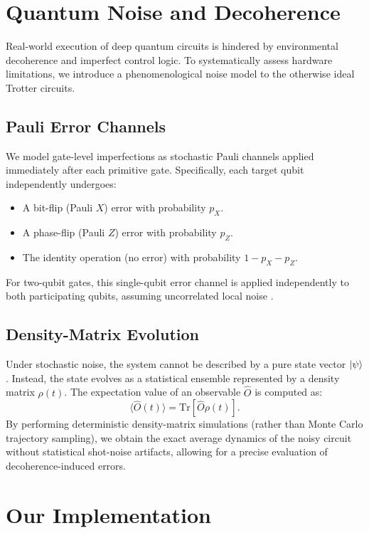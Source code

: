 \documentclass[11pt,a4paper]{article}
\begin{document}
\section{Quantum Noise and Decoherence} \label{sec:noise}

Real-world execution of deep quantum circuits is hindered by environmental decoherence and imperfect control logic. To systematically assess hardware limitations, we introduce a phenomenological noise model to the otherwise ideal Trotter circuits.

\subsection{Pauli Error Channels}
We model gate-level imperfections as stochastic Pauli channels applied immediately after each primitive gate. Specifically, each target qubit independently undergoes:
\begin{itemize}
    \item A bit-flip (Pauli $X$) error with probability $p_X$.
    \item A phase-flip (Pauli $Z$) error with probability $p_Z$.
    \item The identity operation (no error) with probability $1 - p_X - p_Z$.
\end{itemize}
For two-qubit gates, this single-qubit error channel is applied independently to both participating qubits, assuming uncorrelated local noise \cite{Krantz2019}.

\subsection{Density-Matrix Evolution}
Under stochastic noise, the system cannot be described by a pure state vector $\ket{\psi}$. Instead, the state evolves as a statistical ensemble represented by a density matrix $\rho(t)$. The expectation value of an observable $\hat{O}$ is computed as:
\begin{equation}
\langle \hat{O}(t) \rangle = \text{Tr}[\hat{O} \rho(t)].
\end{equation}
By performing deterministic density-matrix simulations (rather than Monte Carlo trajectory sampling), we obtain the exact average dynamics of the noisy circuit without statistical shot-noise artifacts, allowing for a precise evaluation of decoherence-induced errors.

\section{Our Implementation} \label{sec:implementation}
\end{document}

